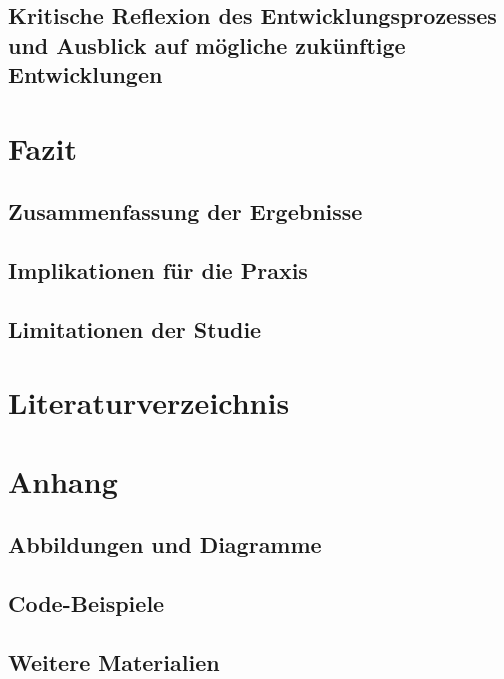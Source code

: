\documentclass[12pt,a4paper,bibliography=totocnumbered,listof=totocnumbered]{scrartcl}
\begin{document}
\subsection{Kritische Reflexion des Entwicklungsprozesses und Ausblick auf mögliche zukünftige Entwicklungen}
\section{Fazit}
\subsection{Zusammenfassung der Ergebnisse}
\subsection{Implikationen für die Praxis}
\subsection{Limitationen der Studie}
\section{Literaturverzeichnis}
\section{Anhang}
\subsection{Abbildungen und Diagramme}
\subsection{Code-Beispiele}
\subsection{Weitere Materialien}
\end{document}
